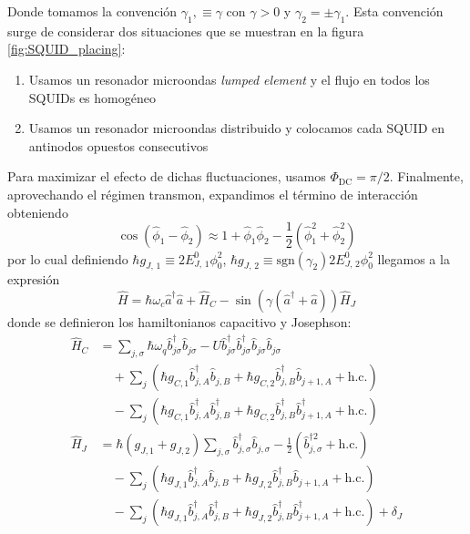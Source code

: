 Donde tomamos la convención $\gamma_1, \equiv \gamma$ con $\gamma > 0$ y $\gamma_2 = \pm \gamma_1$. Esta convención surge de considerar dos situaciones que se muestran en la figura \ref{fig:SQUID_placing}:
\begin{enumerate}
    \item Usamos un resonador microondas \textit{lumped element} y el flujo en todos los SQUIDs es homogéneo
    \item Usamos un resonador microondas distribuido y colocamos cada SQUID en antinodos opuestos consecutivos
\end{enumerate}
Para maximizar el efecto de dichas fluctuaciones, usamos $\Phi_{\text{DC}} = \pi/2$. Finalmente, aprovechando el régimen transmon, expandimos el término de interacción obteniendo
\begin{equation}
    \cos(\hat \phi_1 - \hat \phi_2) \approx 1 + \hat \phi_1 \hat \phi_2 - \frac{1}{2}(\hat \phi_1^2 + \hat \phi_2^2)
\end{equation}
por lo cual definiendo $\hbar g_{J,\,1} \equiv 2E_{J,\,1}^0\phi_0^2$, $\hbar g_{J, \, 2} \equiv \text{sgn}(\gamma_2) 2E_{J, \, 2}^0 \phi_0^2$ llegamos a la expresión
\begin{equation}
    \hat H = \hbar \omega_c \hat a^\dag \hat a + \hat H_C 
                - \sin\!\left(\gamma(\hat a^\dag + \hat a)\right) \hat H_J
\end{equation}
donde se definieron los hamiltonianos capacitivo y Josephson: 
\begin{subequations}
    \begin{align}
        \hat H_C &= \sum_{j, \sigma} \hbar \omega_q \hat b^\dag_{j\sigma} \hat b_{j\sigma} - U\hat b^\dag_{j\sigma}\hat b^\dag_{j\sigma}\hat b_{j\sigma}\hat b_{j\sigma}\nonumber\\
                &\quad+ \sum_j \left(\hbar g_{C,1}\hat b^\dag_{j,A}\hat b_{j,B} + \hbar g_{C,2}\hat b^\dag_{j,B} \hat b_{j+1,A} +\text{h.c.}\right)\nonumber\\ 
               &\quad-\sum_j \left(\hbar g_{C,1}\hat b^\dag_{j,A}\hat b^\dag_{j,B} + \hbar g_{C,2}\hat b^\dag_{j,B} \hat b^\dag_{j+1,A}+\text{h.c.} \right) \\
        \hat H_J &= \hbar(g_{J,1} + g_{J,2})\sum_{j,\sigma}  
                \hat b^\dag_{j,\sigma}\hat b_{j,\sigma} 
                - \frac{1}{2}\left(\hat b^{\dag 2}_{j,\sigma} + \text{h.c.}\right) \nonumber\\
               &\quad - \sum_j \left(\hbar g_{J,1}\hat b^\dag_{j,A}\hat b_{j,B} 
                + \hbar g_{J,2}\hat b^\dag_{j,B} \hat b_{j+1,A} + \text{h.c.}\right) \nonumber\\
               &\quad - \sum_j \left(\hbar g_{J,1}\hat b^\dag_{j,A}\hat b^\dag_{j,B} 
                + \hbar g_{J,2}\hat b^\dag_{j,B} \hat b^\dag_{j+1,A} + \text{h.c.}\right) + \delta_J \label{eq:Josephson_H_real}
    \end{align}\label{eq:real_space_hamiltonians}
\end{subequations}
